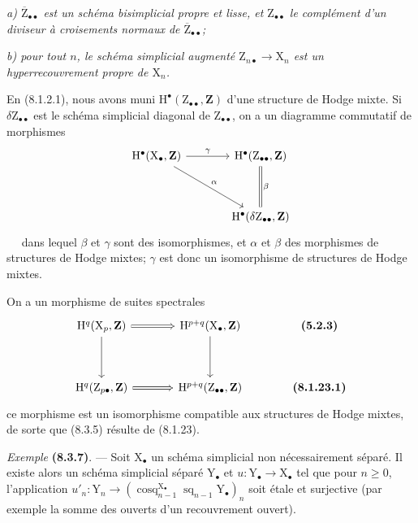 \documentclass[11pt,leqno]{article}
\newcommand{\Page}[1]{\ifvmode\noindent\else\unskip\ \fi{\footnotesize\textcolor{gray}{[p.\,#1]}}\ \ignorespaces}
\begin{document}
\textit{a) \(\overline{\mathrm{Z}}_{\bullet\bullet}\) est un schéma bisimplicial propre et lisse, et \(\mathrm{Z}_{\bullet\bullet}\) le complément d’un diviseur à croisements normaux de \(\overline{\mathrm{Z}}_{\bullet\bullet}\);}

\textit{b) pour tout \(n\), le schéma simplicial augmenté \(\mathrm{Z}_{n\bullet}\to\mathrm{X}_n\) est un hyperrecouvrement propre de \(\mathrm{X}_n\).}

En (8.1.2.1), nous avons muni \(\mathrm{H}^\bullet(\mathrm{Z}_{\bullet\bullet},\mathbf{Z})\) d’une structure de Hodge mixte. Si \(\delta\mathrm{Z}_{\bullet\bullet}\) est le schéma simplicial diagonal de \(\mathrm{Z}_{\bullet\bullet}\), on a un diagramme commutatif de morphismes
\[
\begin{tikzcd}[column sep=large,row sep=huge]
\mathrm{H}^\bullet(\mathrm{X}_\bullet,\mathbf{Z})
  \arrow[r,"\gamma"] \arrow[dr,"\alpha"]
 & \mathrm{H}^\bullet(\mathrm{Z}_{\bullet\bullet},\mathbf{Z})
   \arrow[d,equal,"\beta"]\\
 & \mathrm{H}^\bullet(\delta\mathrm{Z}_{\bullet\bullet},\mathbf{Z})
\end{tikzcd}
\]
\Page{43}
dans lequel \(\beta\) et \(\gamma\) sont des isomorphismes, et \(\alpha\) et \(\beta\) des morphismes de structures de Hodge mixtes; \(\gamma\) est donc un isomorphisme de structures de Hodge mixtes.

On a un morphisme de suites spectrales
\[
\begin{tikzcd}[column sep=large,row sep=huge]
\mathrm{H}^q(\mathrm{X}_p,\mathbf{Z})
  \arrow[r,Rightarrow] \arrow[d]
 & \mathrm{H}^{p+q}(\mathrm{X}_\bullet,\mathbf{Z}) \arrow[d]
 & \text{\textbf{(5.2.3)}}\\
\mathrm{H}^q(\mathrm{Z}_{p\bullet},\mathbf{Z})
  \arrow[r,Rightarrow]
 & \mathrm{H}^{p+q}(\mathrm{Z}_{\bullet\bullet},\mathbf{Z})
 & \text{\textbf{(8.1.23.1)}}
\end{tikzcd}
\]
ce morphisme est un isomorphisme compatible aux structures de Hodge mixtes, de sorte que (8.3.5) résulte de (8.1.23).

\textit{Exemple} \textbf{(8.3.7)}. — Soit \(\mathrm{X}_\bullet\) un schéma simplicial non nécessairement séparé. Il existe alors un schéma simplicial séparé \(\mathrm{Y}_\bullet\) et \(u:\mathrm{Y}_\bullet\to\mathrm{X}_\bullet\) tel que pour \(n\geq0\), l’application \(u'_n:\mathrm{Y}_n\to(\operatorname{cosq}_{n-1}^{\mathrm{X}_\bullet}\operatorname{sq}_{n-1}\mathrm{Y}_\bullet)_n\) soit étale et surjective (par exemple la somme des ouverts d’un recouvrement ouvert).
\end{document}

